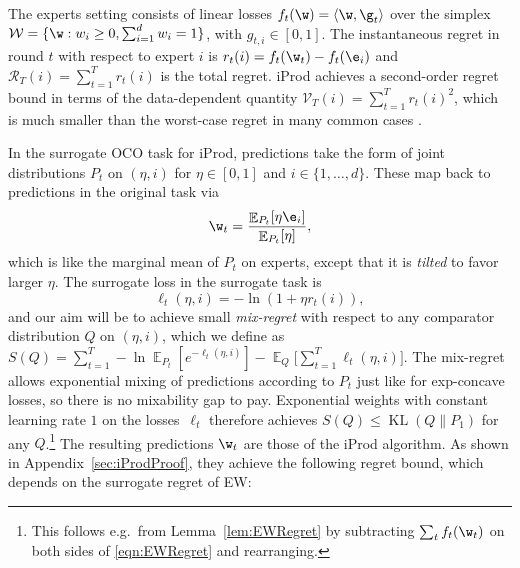 \documentclass{colt2018} %
\DeclareMathOperator*{\E}{\mathbb{E}}
\DeclareMathOperator{\kl}{KL}
\newcommand{\domainw}{\mathcal{W}}
\newcommand{\inner}[2]{\langle #1, #2 \rangle}  %
\newcommand{\sloss}{\ell}                       %
\newcommand{\sregret}{S}                        %
\newcommand{\regret}{\mathcal{R}}
\newcommand{\V}{\mathcal{V}}                    %
\begin{document}
The experts setting consists of linear losses $f_t(\w) =
\inner{\w}{\g_t}$ over the simplex $\domainw = \{\w: w_i \geq 0,
\sum_{i=1}^d w_i = 1\}$, with $g_{t,i} \in [0,1]$. The instantaneous regret in round $t$ with
respect to expert $i$ is $r_t(i) = f_t(\w_t) - f_t(\e_i)$ and
$\regret_T(i) = \sum_{t=1}^T r_t(i)$ is the total regret. iProd achieves a
second-order regret bound in terms of the data-dependent quantity
$\V_T(i) = \sum_{t=1}^T r_t(i)^2$, which is much smaller than the
worst-case regret in many common cases
\citep{KoolenGrunwaldVanErven2016}.

In the surrogate OCO task for iProd, predictions take the form of joint
distributions $P_t$ on $(\eta,i)$ for $\eta \in [0,1]$ and $i \in
\{1,\ldots,d\}$. These map back to predictions in the original task via
% 
\begin{equation}\label{eqn:wreduction}
  \w_t = \frac{\E_{P_t}[\eta \e_i]}{\E_{P_t}[\eta]},
\end{equation}
% 
which is like the marginal mean of $P_t$ on experts, except that it is
\emph{tilted} to favor larger $\eta$. The surrogate loss in the
surrogate task is
% 
\begin{equation}\label{eqn:iProdSurrogateLoss}
  \sloss_t(\eta,i) = -\ln \left(1 + \eta r_t(i)\right),
\end{equation}
% 
and our aim will be to achieve small \emph{mix-regret} with respect to
any comparator distribution $Q$ on $(\eta,i)$, which we define as
% 
% 
  $\sregret(Q)
    = \sum_{t=1}^T -\ln \E_{P_t}\left[e^{-\sloss_t(\eta,i)}\right]
      - \E_{Q}\Big[\sum_{t=1}^T \sloss_t(\eta,i)\Big]$.
% 
% 
The mix-regret allows exponential mixing of predictions according to
$P_t$ just like for exp-concave losses, so there is no mixability gap to
pay. Exponential weights with constant learning rate $1$ on the losses~$\sloss_t$ therefore achieves $\sregret(Q) \leq
\kl(Q\|P_1)$ for any $Q$.\footnote{This follows e.g.\ from
Lemma~\ref{lem:EWRegret} by subtracting $\sum_t f_t(\w_t)$ on both sides
of \eqref{eqn:EWRegret} and rearranging.} The resulting predictions
$\w_t$ are those of the iProd algorithm. As shown in
Appendix~\ref{sec:iProdProof}, they achieve the following regret bound,
which depends on the surrogate regret of EW:
% 
\end{document}
